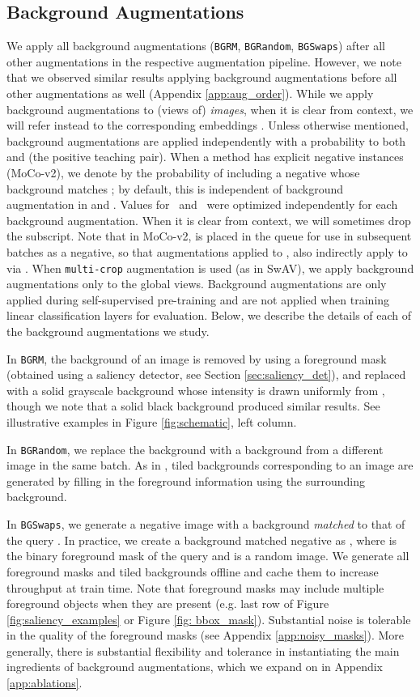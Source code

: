 \documentclass[twoside,11pt]{article}
\newcommand{\bgrm}{\texttt{BG\textunderscore RM}}
\newcommand{\bgswaps}{\texttt{BG\textunderscore Swaps}}
\newcommand{\bgrand}{\texttt{BG\textunderscore Random}}
\newcommand{\pneg}{}
\newcommand{\ppos}{}
\newcommand{\moco}{MoCo-v2}
\begin{document}
\subsection{Background Augmentations}
\label{sec:bg_augs_methods}
We apply all background augmentations (\bgrm, \bgrand, \bgswaps) after all other augmentations in the respective augmentation pipeline. However, we note that we observed similar results applying background augmentations before all other augmentations as well (Appendix \ref{app:aug_order}). While we apply background augmentations to (views of) \textit{images}, when it is clear from context, we will refer instead to the corresponding embeddings . Unless otherwise mentioned, background augmentations are applied independently with a probability  to both  and  (the positive teaching pair). When a method has explicit negative instances (\moco), we denote by  the probability of including a negative whose background matches ; by default, this is independent of background augmentation in  and . Values for \ppos~and \pneg~were optimized independently for each background augmentation. When it is clear from context, we will sometimes drop the subscript. Note that in \moco,  is placed in the queue  for use in subsequent batches as a negative, so that augmentations applied to , also indirectly apply to  via .  When \texttt{multi-crop} augmentation is used (as in SwAV), we apply background augmentations only to the global views. Background augmentations are only applied during self-supervised pre-training and are not applied when training linear classification layers for evaluation. Below, we describe the details of each of the background augmentations we study.

In \bgrm, the background of an image is removed by using a foreground mask (obtained using a saliency detector, see Section \ref{sec:saliency_det}), and replaced with a solid grayscale background whose intensity is drawn uniformly from , though we note that a solid black background produced similar results. See illustrative examples in Figure \ref{fig:schematic}, left column. 

In \bgrand, we replace the background with a background from a different image in the same batch. As in \citet{xiao2020noise}, tiled backgrounds corresponding to an image are generated by filling in the foreground information using the surrounding background.

In \bgswaps, we generate a negative image with a background \textit{matched} to that of the query . In practice, we create a background matched negative as , where  is the binary foreground mask of the query  and  is a random image. We generate all foreground masks and tiled backgrounds offline and cache them to increase throughput at train time. Note that foreground masks may include multiple foreground objects when they are present (e.g. last row of Figure \ref{fig:saliency_examples} or Figure \ref{fig: bbox_mask}). Substantial noise is tolerable in the quality of the foreground masks (see Appendix \ref{app:noisy_masks}). More generally, there is substantial flexibility and tolerance in instantiating the main ingredients of background augmentations, which we expand on in Appendix \ref{app:ablations}. 
\end{document}
